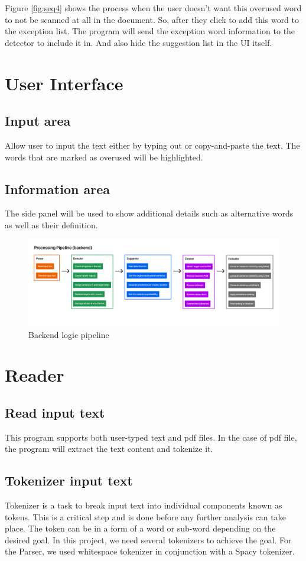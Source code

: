 \documentclass[12pt,oneside,openright,a4paper]{cpe-english-project}
\begin{document}
Figure \ref{fig:seq4} shows the process when the user doesn’t want this overused word to not be scanned at all in the document. So, after they click to add this word to the exception list. The program will send the exception word information to the detector to include it in. And also hide the suggestion list in the UI itself.

\section{User Interface}
\subsection{Input area}
Allow user to input the text either by typing out or copy-and-paste the text.
The words that are marked as overused will be highlighted.
\subsection{Information area}
The side panel will be used to show additional details such as alternative words as well as their definition. 

\begin{figure}[!h]\centering
\includegraphics[width=15cm]{./img/chp3/processsingPipe.png}
\caption{Backend logic pipeline}\label{fig:corePP}
\end{figure}
\section{Reader}
\subsection{Read input text}
This program supports both user-typed text and pdf files. In the case of pdf file, the program will extract the text content and tokenize it.
\subsection{Tokenizer input text}
Tokenizer is a task to break input text into individual components known as tokens. This is a critical step and is done before any further analysis can take place. The token can be in a form of a word or sub-word depending on the desired goal. In this project, we need several tokenizers to achieve the goal. For the Parser, we used whitespace tokenizer in conjunction with a Spacy tokenizer. 
\end{document}
